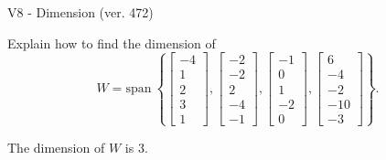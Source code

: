 \begin{exercise}
  \begin{exerciseTitle}V8 - Dimension (ver. 472)\end{exerciseTitle}
  \begin{exerciseStatement}
    Explain how to find the dimension of 
\[W=\mathrm{span}\ \left\{\left[\begin{array}{r}
-4 \\
1 \\
2 \\
3 \\
1
\end{array}\right] , \left[\begin{array}{r}
-2 \\
-2 \\
2 \\
-4 \\
-1
\end{array}\right] , \left[\begin{array}{r}
-1 \\
0 \\
1 \\
-2 \\
0
\end{array}\right] , \left[\begin{array}{r}
6 \\
-4 \\
-2 \\
-10 \\
-3
\end{array}\right]\right\}.\]



  \end{exerciseStatement}
  \begin{exerciseAnswer}
   The dimension of \(W\) is  \(3\).
  


  \end{exerciseAnswer}
\end{exercise}
